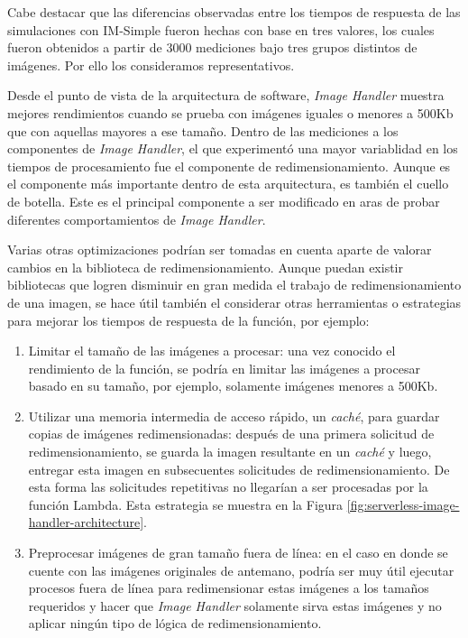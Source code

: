 Cabe destacar que las diferencias observadas entre los tiempos de respuesta de las simulaciones con IM-Simple fueron hechas con base en tres valores, los cuales fueron obtenidos a partir de 3000 mediciones bajo tres grupos distintos de imágenes. Por ello los consideramos representativos.

Desde el punto de vista de la arquitectura de software, \emph{Image Handler} muestra mejores rendimientos cuando se prueba con imágenes iguales o menores a 500Kb que con aquellas mayores a ese tamaño. Dentro de las mediciones a los componentes de \emph{Image Handler}, el que experimentó una mayor variablidad en los tiempos de procesamiento fue el componente de redimensionamiento. Aunque es el componente más importante dentro de esta arquitectura, es también el cuello de botella. Este es el principal componente a ser modificado en aras de probar diferentes comportamientos de \emph{Image Handler}. 

Varias otras optimizaciones podrían ser tomadas en cuenta aparte de valorar cambios en la biblioteca de redimensionamiento. Aunque puedan existir bibliotecas que logren disminuir en gran medida el trabajo de redimensionamiento de una imagen, se hace útil también el considerar otras herramientas o estrategias para mejorar los tiempos de respuesta de la función, por ejemplo:
\begin{enumerate}
    \item Limitar el tamaño de las imágenes a procesar: una vez conocido el rendimiento de la función, se podría en limitar las imágenes a procesar basado en su tamaño, por ejemplo, solamente imágenes menores a 500Kb.
    \item Utilizar una memoria intermedia de acceso rápido, un \emph{caché}, para guardar copias de imágenes redimensionadas: después de una primera solicitud de redimensionamiento, se guarda la imagen resultante en un \emph{caché} y luego, entregar esta imagen en subsecuentes solicitudes de redimensionamiento. De esta forma las solicitudes repetitivas no llegarían a ser procesadas por la función Lambda. Esta estrategia se muestra en la Figura \ref{fig:serverless-image-handler-architecture}.
    \item Preprocesar imágenes de gran tamaño fuera de línea: en el caso en donde se cuente con las imágenes originales de antemano, podría ser muy útil ejecutar procesos fuera de línea para redimensionar estas imágenes a los tamaños requeridos y hacer que \emph{Image Handler} solamente sirva estas imágenes y no aplicar ningún tipo de lógica de redimensionamiento.
\end{enumerate}


